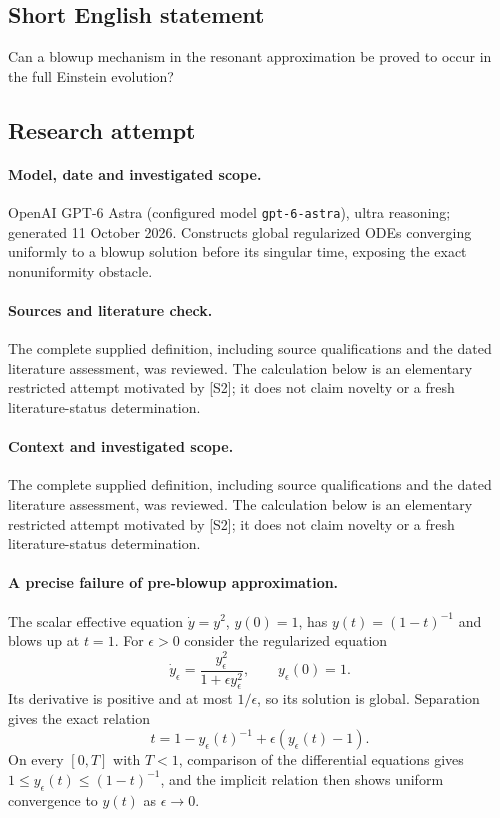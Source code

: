 \documentclass[11pt]{article}
\begin{document}
\subsection{Short English statement}
Can a blowup mechanism in the resonant approximation be proved to occur in the full Einstein evolution?
\subsection{Research attempt}
\paragraph{Model, date and investigated scope.}
OpenAI GPT-6 Astra (configured model \texttt{gpt-6-astra}), ultra reasoning; generated 11 October 2026. Constructs global regularized ODEs converging uniformly to a blowup solution before its singular time, exposing the exact nonuniformity obstacle.

\paragraph{Sources and literature check.}
The complete supplied definition, including source qualifications and the dated literature assessment, was reviewed. The calculation below is an elementary restricted attempt motivated by [S2]; it does not claim novelty or a fresh literature-status determination.

\paragraph{Context and investigated scope.} The complete supplied definition, including source qualifications and the dated literature assessment, was reviewed. The calculation below is an elementary restricted attempt motivated by [S2]; it does not claim novelty or a fresh literature-status determination.

\paragraph{A precise failure of pre-blowup approximation.} The scalar effective equation $\dot y=y^2$, $y(0)=1$, has $y(t)=(1-t)^{-1}$ and blows up at $t=1$. For $\epsilon>0$ consider the regularized equation
\[
 \dot y_\epsilon=\frac{y_\epsilon^2}{1+\epsilon y_\epsilon^2},\qquad y_\epsilon(0)=1.
\]
Its derivative is positive and at most $1/\epsilon$, so its solution is global. Separation gives the exact relation
\[
 t=1-y_\epsilon(t)^{-1}+\epsilon(y_\epsilon(t)-1).
\]
On every $[0,T]$ with $T<1$, comparison of the differential equations gives $1\leq y_\epsilon(t)\leq(1-t)^{-1}$, and the implicit relation then shows uniform convergence to $y(t)$ as $\epsilon\to0$.
\end{document}
